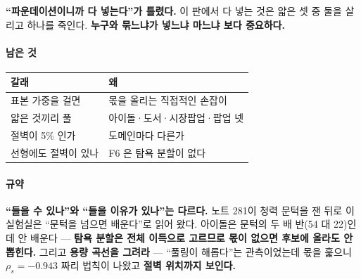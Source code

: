 \documentclass[10pt]{article}
\begin{document}
\textbf{``파운데이션이니까 다 넣는다''가 틀렸다.} 이 판에서 다 넣는 것은
얇은 셋 중 둘을 살리고 하나를 죽인다. \textbf{누구와 묶느냐가 넣느냐 마느냐
보다 중요하다.}

\paragraph{남은 것}
\begin{center}\small
\begin{tabular}{ll}
\hline
갈래 & 왜 \\
\hline
표본 가중을 걸면 & 몫을 올리는 직접적인 손잡이 \\
얇은 것끼리 풀 & 아이돌·도서·시장팝업·팝업 넷 \\
절벽이 5\% 인가 & 도메인마다 다른가 \\
선형에도 절벽이 있나 & F6 은 탐욕 분할이 없다 \\
\hline
\end{tabular}
\end{center}

\paragraph{규약} \textbf{``들을 수 있나''와 ``들을 이유가 있나''는 다르다.}
노트 281이 청력 문턱을 잰 뒤로 이 실험실은 ``문턱을 넘으면 배운다''로
읽어 왔다. 아이돌은 문턱의 두 배 반(54 대 22)인데 안 배운다 --- \textbf{탐욕
분할은 전체 이득으로 고르므로 몫이 없으면 후보에 올라도 안 뽑힌다.}
그리고 \textbf{용량 곡선을 그려라} --- ``풀링이 해롭다''는 관측이었는데
몫을 훑으니 $\rho_s{=}{-}0.943$ 짜리 법칙이 나왔고 \textbf{절벽 위치까지
보인다.}
\end{document}

